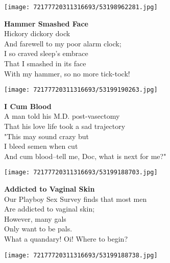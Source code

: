 \documentclass[10pt,letterpaper]{article}
\begin{document}
\begin{center}\texttt{[image: 72177720311316693/53198962281.jpg]}
\end{center}
\begin{center}
\textbf{Hammer Smashed Face}\\
\vskip 0.2in
Hickory dickory dock\\
And farewell to my poor alarm clock;\\
I so craved sleep's embrace\\
That I smashed in its face\\
With my hammer, so no more tick-tock!\\
\end{center}
\pagebreak

\begin{center}
\texttt{[image: 72177720311316693/53199190263.jpg]}
\end{center}

\begin{center}
\textbf{I Cum Blood}\\
\vskip 0.2in
A man told his M.D. post-vasectomy\\
That his love life took a sad trajectory\\
"This may sound crazy but\\
I bleed semen when cut\\
And cum blood--tell me, Doc, what is next for me?"\\
\end{center}
\pagebreak

\begin{center}
\texttt{[image: 72177720311316693/53199188703.jpg]}
\end{center}

\begin{center}
\textbf{Addicted to Vaginal Skin}\\
\vskip 0.2in
Our Playboy Sex Survey finds that most men\\
Are addicted to vaginal skin;\\
However, many gals\\
Only want to be pals.\\
What a quandary!  Oi!  Where to begin?\\
\end{center}
\pagebreak

\begin{center}
\texttt{[image: 72177720311316693/53199188738.jpg]}
\end{center}
\end{document}
